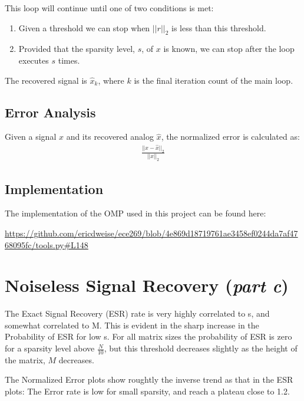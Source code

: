 \documentclass{article}
\begin{document}
This loop will continue until one of two conditions is met:
\begin{enumerate}[leftmargin=1.5cm,labelsep=0cm,align=left]
    \item Given a threshold we can stop when $||r||_2$ is less than this threshold.
    \item Provided that the sparsity level, $s$, of $x$ is known, we can stop after the loop executes $s$ times.
\end{enumerate}

The recovered signal is $\hat{x}_k$, where $k$ is the final iteration count of the main loop.


\subsection*{Error Analysis}
Given a signal $x$ and its recovered analog $\hat{x}$, the normalized error is calculated as:
\begin{align*}
    \frac{||x-\hat{x}||_2}{||x||_2}
\end{align*}


\subsection*{Implementation}
The implementation of the OMP used in this project can be found here:

\url{https://github.com/ericdweise/ece269/blob/4e869d18719761ae3458ef0244da7af4768095fc/tools.py#L148}









\newpage

\section{Noiseless Signal Recovery ({\it part c})}


The Exact Signal Recovery (ESR) rate is very highly correlated to s, and somewhat correlated to M.
This is evident in the sharp increase in the Probability of ESR for low s.
For all matrix sizes the probability of ESR is zero for a sparsity level above $\frac{N}{10}$,
but this threshold decreases slightly as the height of the matrix, $M$ decreases.

The Normalized Error plots show roughtly the inverse trend as that in the ESR plots:
The Error rate is low for small sparsity, and reach a plateau close to 1.2.
\end{document}
